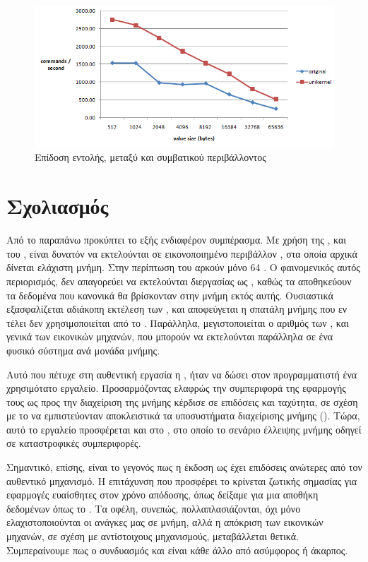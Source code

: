 \begin{figure}[h]
  \includegraphics[width=\textwidth]{pictures/secondBenchmarkResults3.PNG}
  \caption{Επίδοση  εντολής, μεταξύ  και συμβατικού περιβάλλοντος}
  \label{fig:original-unikernelSet}
\end{figure}




\section{Σχολιασμός}

Από το παραπάνω προκύπτει το εξής ενδιαφέρον συμπέρασμα. Με
χρήση της , και του , είναι
δυνατόν να εκτελούνται σε εικονοποιημένο περιβάλλον ,
στα οποία αρχικά δίνεται ελάχιστη μνήμη. Στην περίπτωση
του  αρκούν μόνο 64 . Ο φαινομενικός αυτός περιορισμός,
δεν απαγορεύει να εκτελούνται  διεργασίας
ως , καθώς τα  αποθηκεύουν τα δεδομένα που
κανονικά θα βρίσκονταν στην μνήμη εκτός αυτής. Ουσιαστικά εξασφαλίζεται
αδιάκοπη εκτέλεση των , και αποφεύγεται η σπατάλη
μνήμης που εν τέλει δεν χρησιμοποιείται από το .
Παράλληλα, μεγιστοποιείται ο αριθμός των , και
γενικά των εικονικών μηχανών, που μπορούν να εκτελούνται
παράλληλα σε ένα φυσικό σύστημα ανά μονάδα μνήμης.
\newline

Αυτό που πέτυχε στη αυθεντική εργασία η \cite{Aimilios}, ήταν να
δώσει στον προγραμματιστή ένα χρησιμότατο εργαλείο.
Προσαρμόζοντας ελαφρώς την συμπεριφορά της εφαρμογής
τους ως προς την διαχείριση της μνήμης κέρδισε σε επιδόσεις
και ταχύτητα, σε σχέση με το να εμπιστεύονταν αποκλειστικά
τα υποσυστήματα διαχείρισης μνήμης (). Τώρα,
αυτό το εργαλείο προσφέρεται και στο ,
στο οποίο το σενάριο έλλειψης μνήμης οδηγεί σε καταστροφικές συμπεριφορές.
\newline

Σημαντικό, επίσης, είναι το γεγονός πως η έκδοση  ως  έχει
επιδόσεις ανώτερες από τον αυθεντικό μηχανισμό. Η επιτάχυνση που προσφέρει το  κρίνεται
ζωτικής σημασίας για εφαρμογές ευαίσθητες στον χρόνο απόδοσης, όπως δείξαμε για μια αποθήκη δεδομένων
όπως το . Τα οφέλη, συνεπώς, πολλαπλασιάζονται, όχι μόνο ελαχιστοποιούνται οι ανάγκες μας σε μνήμη, αλλά
η απόκριση των εικονικών μηχανών, σε σχέση με αντίστοιχους μηχανισμούς, μεταβάλλεται θετικά.
Συμπεραίνουμε πως ο συνδυασμός  και  είναι κάθε άλλο από ασύμφορος ή άκαρπος.
